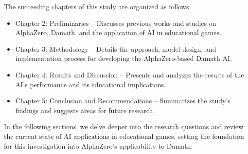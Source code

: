 The succeeding chapters of this study are organized as follows:
\begin{itemize}
    \item Chapter 2: Preliminaries – Discusses previous works and studies on AlphaZero, Damath, and the application of AI in educational games.
    \item Chapter 3: Methodology – Details the approach, model design, and implementation process for developing the AlphaZero-based Damath AI.
    \item Chapter 4: Results and Discussion – Presents and analyzes the results of the AI’s performance and its educational implications.
    \item Chapter 5: Conclusion and Recommendations – Summarizes the study’s findings and suggests areas for future research.
\end{itemize}

In the following sections, we delve deeper into the research questions and review the current state of AI applications in educational games, setting the foundation for this investigation into AlphaZero’s applicability to Damath.